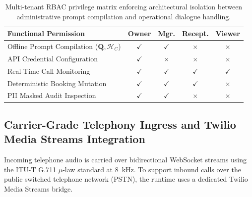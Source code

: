 \documentclass[review,12pt,times,authoryear]{elsarticle}
\theoremstyle{definition}
\begin{document}
\begin{table}[t]
\centering
\small
\setlength{\tabcolsep}{3.5pt}
\renewcommand{\arraystretch}{1.15}
\begin{tabularx}{\columnwidth}{@{}Xcccc@{}}
\toprule[1.2pt]
\rowcolor{eaNavy!10}
\textbf{Functional Permission} & \textbf{Owner} & \textbf{Mgr.} & \textbf{Recept.} & \textbf{Viewer} \\
\midrule[0.8pt]
Offline Prompt Compilation ($\mathbf{Q}, \mathcal{H}_C$) & $\bm{\checkmark}$ & $\bm{\checkmark}$ & $\bm{\times}$ & $\bm{\times}$ \\
\rowcolor{gray!5}
API Credential Configuration & $\bm{\checkmark}$ & $\bm{\times}$ & $\bm{\times}$ & $\bm{\times}$ \\
Real-Time Call Monitoring & $\bm{\checkmark}$ & $\bm{\checkmark}$ & $\bm{\checkmark}$ & $\bm{\checkmark}$ \\
\rowcolor{gray!5}
Deterministic Booking Mutation & $\bm{\checkmark}$ & $\bm{\checkmark}$ & $\bm{\checkmark}$ & $\bm{\times}$ \\
PII Masked Audit Inspection & $\bm{\checkmark}$ & $\bm{\checkmark}$ & $\bm{\times}$ & $\bm{\times}$ \\
\bottomrule[1.2pt]
\end{tabularx}
\caption{Multi-tenant RBAC privilege matrix enforcing architectural isolation between administrative prompt compilation and operational dialogue handling.}
\label{tab:rbac_matrix}
\end{table}

\subsection{Carrier-Grade Telephony Ingress and Twilio Media Streams Integration}
Incoming telephone audio is carried over bidirectional WebSocket streams using the ITU-T G.711 $\mu$-law standard at \SI{8}{\kilo\hertz}. To support inbound calls over the public switched telephone network (PSTN), the runtime uses a dedicated Twilio Media Streams bridge. 
\end{document}

